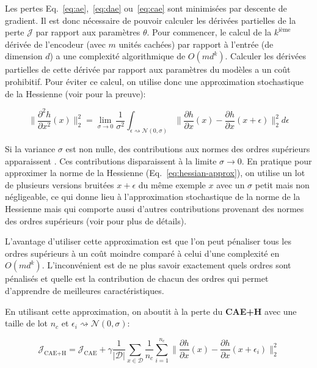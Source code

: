 Les pertes Eq.~\ref{eq:ae},~\ref{eq:dae} ou~\ref{eq:cae} sont minimisées par
descente de gradient. Il est donc nécessaire de pouvoir calculer les dérivées
partielles de la perte $\mathcal{J}$ par rapport aux paramètres $\theta$. Pour commencer, le calcul de
la $k^{\textrm{ième}}$ dérivée de l'encodeur (avec $m$ unités cachées) par
rapport à l'entrée (de dimension $d$) a une complexité algorithmique de
$O(md^k)$.  Calculer les dérivées partielles de cette dérivée par rapport aux
paramètres du modèles a un coût prohibitif. Pour éviter ce calcul, on utilise donc
une approximation stochastique de la Hessienne (voir \cite{Salah+al-2011} pour
la preuve):

\begin{equation}
\|\dfrac{\partial^2 h}{\partial x^2}(x) \|_2^2 = \lim_{\sigma\rightarrow 0}\frac{1}{\sigma^2}\int_{\epsilon \rightsquigarrow \mathcal{N}(0,\sigma)} \| \dfrac{\partial h}{\partial x}(x) - \dfrac{\partial h}{\partial x}(x+\epsilon) \|^2_2 d\epsilon
\label{eq:hessian-approx}
\end{equation}

Si la variance $\sigma$ est non nulle, des contributions aux normes des ordres
supérieurs apparaissent \citep{Salah+al-2011}. Ces contributions disparaissent à
la limite $\sigma\rightarrow 0$. En pratique pour approximer la norme de la
Hessienne (Eq.~\ref{eq:hessian-approx}), on utilise un lot de plusieurs
versions bruitées $x+\epsilon$ du m\^eme exemple $x$ avec un $\sigma$ petit
mais non négligeable, ce qui donne lieu à l'approximation stochastique de la
norme de la Hessienne mais qui comporte aussi d'autres contributions provenant des
normes des ordres supérieurs (voir \cite{Salah+al-2011} pour plus de détails).

L'avantage d'utiliser cette approximation est que l'on peut pénaliser tous les
ordres supérieurs à un coût moindre comparé à celui d'une complexité en $O(md^k)$.
L'inconvénient est de ne plus savoir exactement quels ordres sont pénalisés et
quelle est la contribution de chacun des ordres qui permet d'apprendre de
meilleures caractéristiques. 

En utilisant cette approximation,  on aboutit à la perte du \textbf{CAE+H} avec
une taille de lot $n_c$ et $\epsilon_i \rightsquigarrow \mathcal{N}(0,\sigma)$:

\begin{equation}
\mathcal{J}_\textrm{CAE+H} = \mathcal{J}_\textrm{CAE} + \gamma\frac{1}{\vert \mathcal{D}\vert}\sum_{x\in\mathcal{D}} \frac{1}{n_c}\sum^{n_c}_{i=1} \| \dfrac{\partial h}{\partial x}(x) - \dfrac{\partial h}{\partial x}(x+\epsilon_i) \|^2_2 
\label{eq:cae}
\end{equation}

